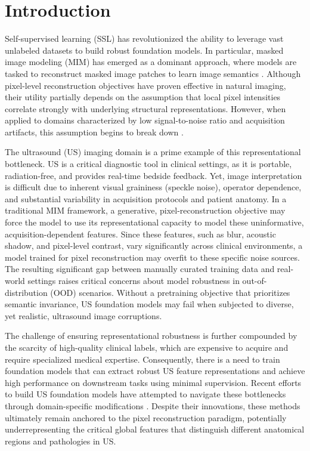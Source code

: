 \documentclass{article}
\theoremstyle{plain}
\theoremstyle{definition}
\theoremstyle{remark}
\begin{document}
\section{Introduction}

Self-supervised learning (SSL) has revolutionized the ability to leverage vast unlabeled datasets to build robust foundation models. In particular, masked image modeling (MIM) has emerged as a dominant approach, where models are tasked to reconstruct masked image patches to learn image semantics \cite{hondru_masked_2025}. Although pixel-level reconstruction objectives have proven effective in natural imaging, their utility partially depends on the assumption that local pixel intensities correlate strongly with underlying structural representations. However, when applied to domains characterized by low signal-to-noise ratio and acquisition artifacts, this assumption begins to break down \cite{xie_rethinking_2024}.

The ultrasound (US) imaging domain is a prime example of this representational bottleneck. US is a critical diagnostic tool in clinical settings, as it is portable, radiation-free, and provides real-time bedside feedback. Yet, image interpretation is difficult due to inherent visual graininess (speckle noise), operator dependence, and substantial variability in acquisition protocols and patient anatomy. In a traditional MIM framework, a generative, pixel-reconstruction objective may force the model to use its representational capacity to model these uninformative, acquisition-dependent features. Since these features, such as blur, acoustic shadow, and pixel-level contrast, vary significantly across clinical environments, a model trained for pixel reconstruction may overfit to these specific noise sources. The resulting significant gap between manually curated training data and real-world settings raises critical concerns about model robustness in out-of-distribution (OOD) scenarios. Without a pretraining objective that prioritizes semantic invariance, US foundation models may fail when subjected to diverse, yet realistic, ultrasound image corruptions.

The challenge of ensuring representational robustness is further compounded by the scarcity of high-quality clinical labels, which are expensive to acquire and require specialized medical expertise. Consequently, there is a need to train foundation models that can extract robust US feature representations and achieve high performance on downstream tasks using minimal supervision. Recent efforts to build US foundation models have attempted to navigate these bottlenecks through domain-specific modifications \cite{jiao_usfm_2024, megahed_usf-mae_2025, zhang_fully_2025}. Despite their innovations, these methods ultimately remain anchored to the pixel reconstruction paradigm, potentially underrepresenting the critical global features that distinguish different anatomical regions and pathologies in US.
\end{document}
